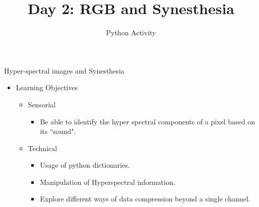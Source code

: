 \documentclass{beamer}
\title[{\color{blue}{Day 2}}]{{Day 2: RGB and Synesthesia}}
\author{Python Activity}
\date{}
\begin{document}
\begin{frame}
   \titlepage
\end{frame}



\begin{frame}{Hyper-spectral images and Synesthesia}
   \begin{itemize}
      \item Learning Objectives
      \begin{itemize}
         \item Sensorial
         \begin{itemize}
            \item Be able to identify the hyper spectral components of a pixel based on its ``sound".
         \end{itemize}
         \item Technical
         \begin{itemize}
            \item Usage of python dictionaries.
            \item Manipulation of Hyperspectral information.
            \item Explore different ways of data compression beyond a single channel.
         \end{itemize}
      \end{itemize}
   \end{itemize}
\end{frame}
\end{document}
